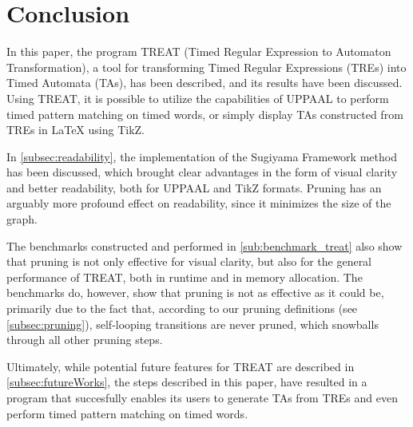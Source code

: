 \section{Conclusion}


In this paper, the program TREAT (Timed Regular Expression to Automaton Transformation), a tool for transforming Timed Regular Expressions (TREs) into Timed Automata (TAs), has been described, and its results have been discussed.
Using TREAT, it is possible to utilize the capabilities of UPPAAL to perform timed pattern matching on timed words, or simply display TAs constructed from TREs in LaTeX using TikZ.

\vspace{.5\baselineskip plus 2pt}
In \cref{subsec:readability}, the implementation of the Sugiyama Framework method has been discussed, which brought clear advantages in the form of visual clarity and better readability, both for UPPAAL and TikZ formats.
Pruning has an arguably more profound effect on readability, since it minimizes the size of the graph.

\vspace{.5\baselineskip plus 2pt}
The benchmarks constructed and performed in \cref{sub:benchmark_treat} also show that pruning is not only effective for visual clarity, but also for the general performance of TREAT, both in runtime and in memory allocation.
The benchmarks do, however, show that pruning is not as effective as it could be, primarily due to the fact that, according to our pruning definitions (see \cref{subsec:pruning}), self-looping transitions are never pruned, which snowballs through all other pruning steps.

\vspace{.5\baselineskip plus 2pt}
Ultimately, while potential future features for TREAT are described in \cref{subsec:futureWorks}, the steps described in this paper, have resulted in a program that succesfully enables its users to generate TAs from TREs and even perform timed pattern matching on timed words.